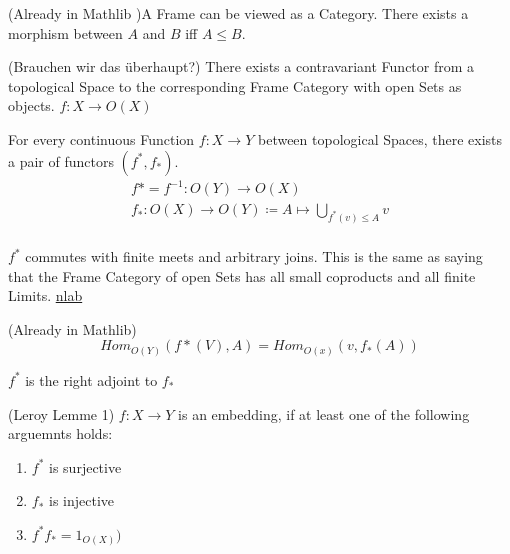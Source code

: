 \begin{lemma}[Frame]
    \label{lem:frame}
    (Already in Mathlib )A Frame can be viewed as a Category.
    There exists a morphism between $A$ and $B$ iff $A \le B$.
    \leanok
\end{lemma}

\begin{definition}
    \label{def:top_frame_func}
    (Brauchen wir das überhaupt?) There exists a contravariant Functor from a topological Space to the corresponding Frame Category with open Sets as objects. $f: X \rightarrow O(X)$
\end{definition}

\begin{definition}[$f^*$ and $f_*$]
    \label{def:f_star}
    \leanok
    For every continuous Function $f : X \rightarrow Y$ between topological Spaces, there exists a pair of functors $(f^*,f_*)$.
    \begin{gather*}
        f* = f^{-1} : O(Y) \rightarrow O(X)\\
        f_* : O(X) \rightarrow O(Y) \coloneqq A \mapsto \bigcup_{f^*(v) \le A} v\\
    \end{gather*}
\end{definition}

\begin{lemma}[$f^*$ commutes]
    \label{lem:f_star_comm}

    $f^*$ commutes with finite meets and arbitrary joins. This is the same as saying that the Frame Category of open Sets has all small coproducts and all finite Limits. \href{https://ncatlab.org/nlab/show/frame}{nlab}
\end{lemma}

\begin{lemma}[Homsets]
    \label{lem:f_star_homsets}
    \leanok
    (Already in Mathlib)
    \[Hom_{O(Y)}(f*(V), A) = Hom_{O(x)}(v, f_*(A))\]
\end{lemma}

\begin{lemma}[$f^* \dashv f_*$]
    \label{lem:f_star_adj}
    \leanok
    $f^*$ is the right adjoint to $f_*$
\end{lemma}

\begin{lemma}[Embedding]
(Leroy Lemme 1)
    \label{lem:embedding}
    $f: X \rightarrow Y$ is an embedding, if at least one of the following arguemnts holds:
    \begin{enumerate}
        \item $f^*$ is surjective
        \item $f_*$ is injective
        \item $f^{*}f_* = 1_{O(X)})$
    \end{enumerate}
\end{lemma}

